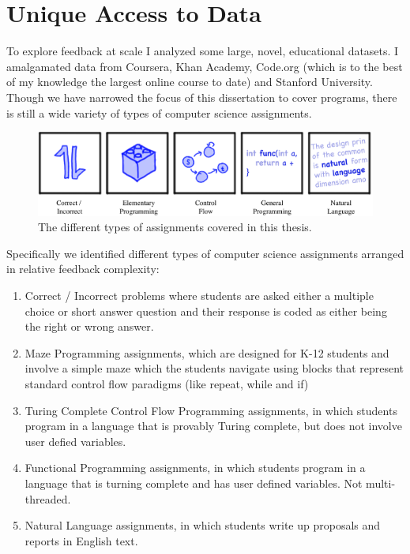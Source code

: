 \section{Unique Access to Data}

To explore feedback at scale I analyzed some large, novel, educational
datasets. I amalgamated data from Coursera, Khan Academy, Code.org (which is to the
best of my knowledge the largest online course to date) and Stanford University. Though we have narrowed the focus of this dissertation to cover programs, there is still a wide variety of types of computer science assignments. 

\begin{figure}[h]
\center
\includegraphics[width=1.0\textwidth]{img/assnType_all}
\caption[Assignment types]{
The different types of assignments covered in this thesis.
\label{fig:assnTypes}
}
\end{figure}

Specifically we identified different types of computer science assignments arranged in relative feedback complexity: 
\begin{enumerate}
\item Correct / Incorrect problems where students are asked either a multiple choice or short answer question and their response is coded as either being the right or wrong answer. 
\item Maze Programming assignments, which are designed for K-12 students and involve a simple maze which the students navigate using blocks that represent standard control flow paradigms (like repeat, while and if)
\item Turing Complete Control Flow Programming assignments, in which students program in a language that is provably Turing complete, but does not involve user defied variables.
\item Functional Programming assignments, in which students program in a language that is turning complete and has user defined variables. Not multi-threaded.
\item Natural Language assignments, in which students write up proposals and reports in English text.	
\end{enumerate}

